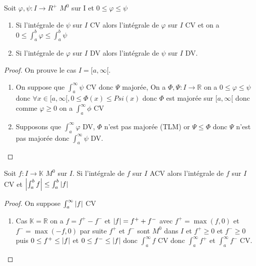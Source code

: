 \documentclass[11pt,hidelinks]{book}
\theoremstyle{mytheoremstyle}
\theoremstyle{mytheoremstyle}
\theoremstyle{mytheoremstyle}
\theoremstyle{mytheoremstyle}
\theoremstyle{mytheoremstyle}
\theoremstyle{mytheoremstyle}
\theoremstyle{mytheoremstyle}
\theoremstyle{mytheoremstyle}
\theoremstyle{myproblemstyle}
\def\mbb#1{\mathbb{#1}}
\def\bR{\mbb{R}}
\def\ib#1{\int_{a}^{b} #1}
\def\ig#1{\int_{a}^{\infty} #1}
\def\bK{\mbb{K}}
\def\af{[a,\infty[}
\newcommand{\func}[3]{#1\colon#2\to#3}
\begin{document}
    \begin{adjustwidth}{-2em}{-1em}
        \begin{theorem}
            Soit $\func{\varphi, \psi}{I}{R^+}$ $M^0$ sur I et $0 \leq \varphi \leq \psi$
            \begin{enumerate}
            \item Si l'intégrale de $\psi$ sur $I$ CV alors l'intégrale de $\varphi$ sur $I$
            CV et on a $0 \leq \ib{\varphi} \leq \ib{\psi}$ \newline 
            \item Si l'intégrale de $\varphi$ sur $I$ DV alors l'intégrale de $\psi$ sur $I$ DV.
            \end{enumerate}
            \begin{proof}
                On prouve le cas $I = \af$. 
                \begin{enumerate}
                \item On suppose que $\ig{\psi}$ CV donc $\Psi$ majorée, On a $\func{\Phi, \Psi}{I}{\bR}$
                on a $0 \leq \varphi \leq \psi$ donc $\forall x \in \af, 0 \leq \Phi(x) \leq Psi(x)$ 
                donc $\Phi$ est majorée sur $\af$ donc comme $\varphi \geq 0$ on a $\ig{\phi}$ CV 
                
                \item Supposons que $\ig{\varphi}$ DV, $\Phi$ n'est pas majorée 
                (TLM) or $\Psi \leq \Phi$ donc $\Psi$ n'est pas majorée donc $\ig{\psi}$ DV.
                \end{enumerate}
            \end{proof}
        \end{theorem}
        \begin{theorem}
            Soit $\func{f}{I}{\bK}$ $M^0$ sur $I$. Si l'intégrale de $f$ sur $I$ ACV alors 
            l'intégrale de $f$ sur $I$ CV et $\abs{\ib{f}} \leq \ib{\abs{f}}$
            \begin{proof}
                On suppose $\ig{\abs{f}}$ CV
                \begin{enumerate} 
                \item Cas $\bK = \bR$
                on a $f = f^+ - f^-$ et $\abs{f} = f^+ + f^-$ avec $f^+ = \max(f,0)$ et $f^- = \max(-f,0)$
                par suite $f^+$ et $f^-$ sont $M^0$ dans $I$ et $f^+ \geq 0$ et $f^- \geq 0$ 
                puis $0 \leq f^+ \leq \abs{f}$ et $0 \leq f^- \leq \abs{f}$ donc $\ig{f}$ CV
                donc $\ig{f^+}$ et $\ig{f^-}$ CV.


\end{enumerate}
\end{proof}
\end{theorem}
\end{adjustwidth}
\end{document}
